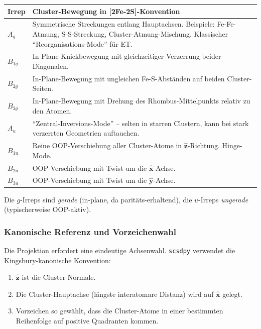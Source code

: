 \documentclass[11pt,a4paper,twoside]{article}
\newcommand{\xhat}{\hat{\mathbf{x}}}
\newcommand{\zhat}{\hat{\mathbf{z}}}
\theoremstyle{remark}
\begin{document}
\begin{center}
\begin{tabular}{lp{8.5cm}}
  \toprule
  \textbf{Irrep} & \textbf{Cluster-Bewegung in [2Fe-2S]-Konvention} \\
  \midrule
  $A_g$    & Symmetrische Streckungen entlang Hauptachsen.
             Beispiele: Fe-Fe-Atmung, S-S-Streckung,
             Cluster-Atmung-Mischung. Klassischer
             "`Reorganisations-Mode"' f\"ur ET. \\
  $B_{1g}$ & In-Plane-Knickbewegung mit gleichzeitiger Verzerrung
             beider Diagonalen. \\
  $B_{2g}$ & In-Plane-Bewegung mit ungleichen Fe-S-Abst\"anden auf
             beiden Cluster-Seiten. \\
  $B_{3g}$ & In-Plane-Bewegung mit Drehung des Rhombus-Mittelpunkts
             relativ zu den Atomen. \\
  $A_u$    & "`Zentral-Inversions-Mode"' -- selten in starren
             Clustern, kann bei stark verzerrten Geometrien
             auftauchen. \\
  $B_{1u}$ & Reine OOP-Verschiebung aller Cluster-Atome in
             $\hat{\mathbf{z}}$-Richtung. Hinge-Mode. \\
  $B_{2u}$ & OOP-Verschiebung mit Twist um die $\hat{\mathbf{x}}$-Achse. \\
  $B_{3u}$ & OOP-Verschiebung mit Twist um die $\hat{\mathbf{y}}$-Achse. \\
  \bottomrule
\end{tabular}
\end{center}

Die $g$-Irreps sind \emph{gerade} (in-plane, da paritäts-erhaltend),
die $u$-Irreps \emph{ungerade} (typischerweise OOP-aktiv).

\subsubsection*{Kanonische Referenz und Vorzeichenwahl}

Die Projektion erfordert eine eindeutige Achsenwahl. \texttt{scsdpy}
verwendet die Kingsbury-kanonische Konvention:

\begin{enumerate}
  \item $\zhat$ ist die Cluster-Normale.
  \item Die Cluster-Hauptachse (l\"angste interatomare Distanz) wird
        auf $\xhat$ gelegt.
  \item Vorzeichen so gew\"ahlt, dass die Cluster-Atome in einer
        bestimmten Reihenfolge auf positive Quadranten kommen.
\end{enumerate}
\end{document}
